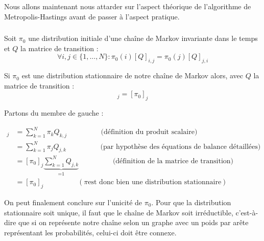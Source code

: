 Nous allons maintenant nous attarder sur l'aspect théorique de l'algorithme de 
Metropolis-Hastings avant de passer à l'aspect pratique.

\subsubsection{}
Soit $\pi_0$ une distribution initiale d'une chaîne de Markov invariante dans le temps et $Q$ la
matrice de transition :
\begin{equation*}
  \forall i,j \in \{1,...,N\} : \pi_0(i)[Q]_{i,j} = \pi_0(j)[Q]_{j,i}
\end{equation*}

Si $\pi_0$ est une distribution stationnaire de notre chaîne de Markov alors, avec $Q$ la matrice de
transition :
\begin{equation}
  [\pi_0 Q]_j = [\pi_0]_j
\end{equation}

Partons du membre de gauche :

\begin{align*}
  [\pi_0 Q]_j &= \sum_{k = 1}^N \pi_k Q_{k,j} \hspace{2cm} \text{(définition du produit scalaire)}\\
              &= \sum_{k = 1}^N \pi_j Q_{j,k} \hspace{2cm} \text{(par hypothèse des équations de balance détaillées)}\\
              &= [\pi_0]_j \underbrace{\sum_{k=1}^N Q_{j,k}}_\textrm{=1} \hspace{2cm} \text{(définition de la matrice de transition)}\\
              &= [\pi_0]_j \hspace{2cm} (\pi \text{est donc bien une distribution stationnaire})
\end{align*}

On peut finalement conclure sur l'unicité de $\pi_0$. Pour que la distribution stationnaire soit unique, il faut que le chaîne de Markov soit irréductible, c'est-à-dire que 
si on représente notre chaîne selon un graphe avec un poids par arête représentant les probabilités, celui-ci doit être connexe.

\subsubsection{}
